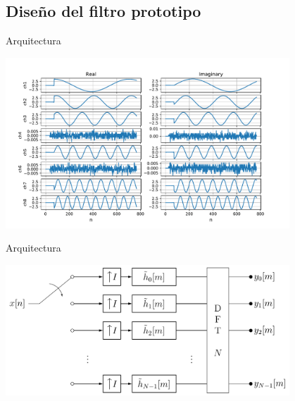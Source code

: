 \documentclass[ignorenonframetext,12pt]{beamer}
\begin{document}
\subsection{Diseño del filtro prototipo}
\begin{frame}{Arquitectura}
				\begin{center}
								\includegraphics[width=0.8\textwidth]{chann16_out_1_8}
				\end{center}
\end{frame}

\begin{frame}{Arquitectura}
				\begin{center}
								\includegraphics[width=0.8\textwidth]{PFB_final_arquitecture}
				\end{center}
\end{frame}
\end{document}
